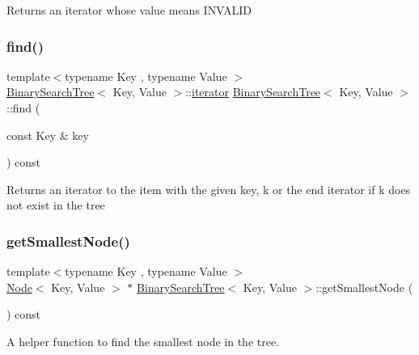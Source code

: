 Returns an iterator whose value means I\+N\+V\+A\+L\+ID \mbox{\label{classBinarySearchTree_ad8772cfce540ec1d9279c674bdb01e40}} 
\subsubsection{\texorpdfstring{find()}{find()}}
{\footnotesize\ttfamily template$<$typename Key , typename Value $>$ \\
\mbox{\hyperlink{classBinarySearchTree}{Binary\+Search\+Tree}}$<$ Key, Value $>$\+::\mbox{\hyperlink{classBinarySearchTree_1_1iterator}{iterator}} \mbox{\hyperlink{classBinarySearchTree}{Binary\+Search\+Tree}}$<$ Key, Value $>$\+::find (\begin{DoxyParamCaption}\item[{const Key \&}]{key }\end{DoxyParamCaption}) const}

Returns an iterator to the item with the given key, k or the end iterator if k does not exist in the tree \mbox{\label{classBinarySearchTree_a04d73a5c985288b8837c2629c3ee0e39}} 
\subsubsection{\texorpdfstring{get\+Smallest\+Node()}{getSmallestNode()}}
{\footnotesize\ttfamily template$<$typename Key , typename Value $>$ \\
\mbox{\hyperlink{classNode}{Node}}$<$ Key, Value $>$ $\ast$ \mbox{\hyperlink{classBinarySearchTree}{Binary\+Search\+Tree}}$<$ Key, Value $>$\+::get\+Smallest\+Node (\begin{DoxyParamCaption}{ }\end{DoxyParamCaption}) const\hspace{0.3cm}{\ttfamily [protected]}}

A helper function to find the smallest node in the tree. \mbox{\label{classBinarySearchTree_af3cd6ac851903ea24fb3be48f10c4015}} 
